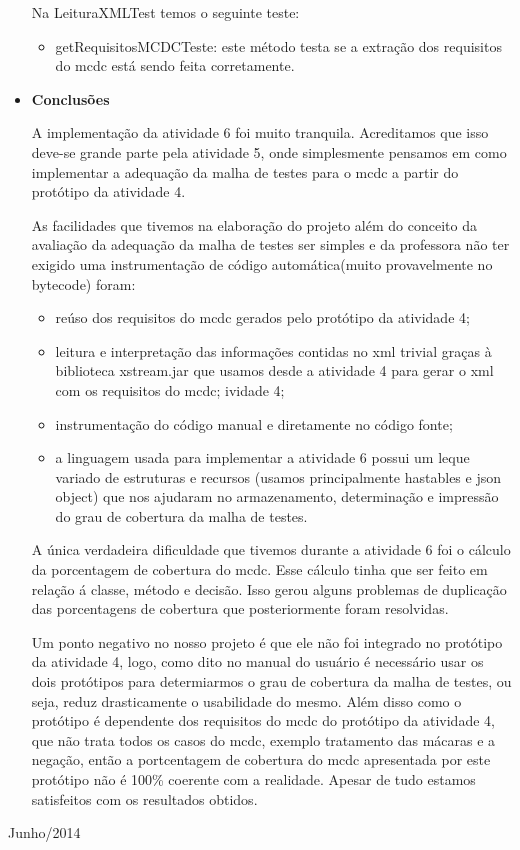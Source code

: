\documentclass[a4paper,11pt]{article}
\newcommand{\sepitem}{\vspace{0.1in}\item}
\begin{document}
\begin{itemize}
Na LeituraXMLTest temos o seguinte teste:
\begin{itemize}
\item getRequisitosMCDCTeste: este método testa se a extração dos requisitos do mcdc está sendo feita corretamente. 
\end{itemize}

\sepitem \textbf{Conclusões}
\setlength{\parindent}{5ex}

A implementação da atividade 6 foi muito tranquila. Acreditamos que isso deve-se grande parte pela atividade 5, onde 
simplesmente pensamos em como implementar a adequação da malha de testes para o mcdc a partir do protótipo da atividade 4.

As facilidades que tivemos na elaboração do projeto além do conceito da avaliação da adequação da malha de testes
ser simples e da professora não ter exigido uma instrumentação de código automática(muito provavelmente no bytecode)
foram:

\begin{itemize}
\item reúso dos requisitos do mcdc gerados pelo protótipo da atividade 4;
\item leitura e interpretação das informações contidas no xml trivial graças à biblioteca xstream.jar que usamos 
desde a atividade 4 para gerar o xml com os requisitos do mcdc;
ividade 4;
\item instrumentação do código manual e diretamente no código fonte;
\item a linguagem usada para implementar a atividade 6 possui um leque variado de estruturas e recursos (usamos principalmente 
hastables e  json object) que nos ajudaram no armazenamento, determinação e impressão do grau de cobertura da malha de testes.
\end{itemize}

A única verdadeira dificuldade que tivemos durante a atividade 6 foi o cálculo da porcentagem de cobertura do mcdc. Esse cálculo 
tinha que ser feito em relação á classe, método e decisão. Isso gerou alguns problemas de duplicação das porcentagens de cobertura
que posteriormente foram resolvidas.

Um ponto negativo no nosso projeto é que ele não foi integrado no protótipo da atividade 4, logo, como dito no manual do usuário 
é necessário usar os dois protótipos para determiarmos o grau de cobertura da malha de testes, ou seja, reduz drasticamente o 
usabilidade do mesmo. Além disso como o protótipo é dependente dos requisitos do mcdc do protótipo da atividade 4, que não trata 
todos os casos do mcdc, exemplo tratamento das mácaras e a negação, então a portcentagem de cobertura do mcdc apresentada por este 
protótipo não é 100\% coerente com a realidade. Apesar de tudo estamos satisfeitos com os resultados obtidos. 

\end{itemize}

\vfill

\raggedleft
{\sc Junho/2014}
\end{document}
